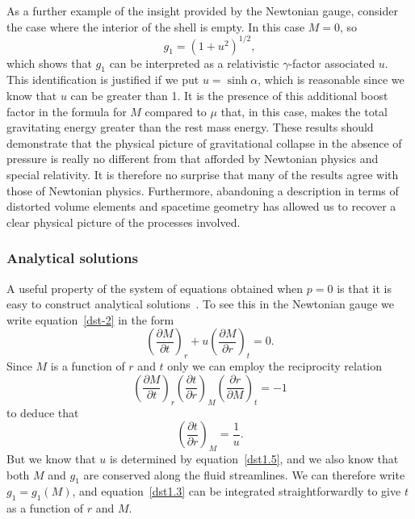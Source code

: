 \documentclass[a4paper]{article}
\numberwithin{equation}{section}
\newcommand{\alp}{\alpha}
\newcommand{\deriv}[2]{\frac{\partial #1}{\partial #2}}
\begin{document}
As a further example of the insight provided by the Newtonian gauge,
consider the case where the interior of the shell is empty.  In this
case $M=0$, so
%
\begin{equation}
g_1 = (1+u^2)^{1/2},
\end{equation}
%
which shows that $g_1$ can be interpreted as a relativistic
$\gamma$-factor associated $u$.  This identification is justified if
we put $u=\sinh\alp$, which is reasonable since we know that $u$ can
be greater than 1.  It is the presence of this additional boost factor
in the formula for $M$ compared to $\mu$ that, in this case, makes
the total gravitating energy greater than the rest mass energy.  These
results should demonstrate that the physical picture of gravitational
collapse in the absence of pressure is really no different from that
afforded by Newtonian physics and special relativity.  It is therefore
no surprise that many of the results agree with those of Newtonian
physics.  Furthermore, abandoning a description in terms of
distorted volume elements and spacetime geometry has allowed us to
recover a clear physical picture of the processes involved.


\subsubsection*{Analytical solutions}

A useful property of the system of equations obtained when $p=0$ is
that it is easy to construct analytical solutions~\cite{tol34,bon47}.
To see this in the Newtonian gauge we write equation~\eqref{dst-2} in the
form
%
\begin{equation}
\left( \deriv{M}{t} \right)_{\!r} + u \left( \deriv{M}{r}
\right)_{\!t} = 0.
\end{equation} 
%
Since $M$ is a function of $r$ and $t$ only we can employ the
reciprocity relation
%
\begin{equation}
\left( \deriv{M}{t} \right)_{\!r}
\left( \deriv{t}{r} \right)_{\!M}
\left( \deriv{r}{M} \right)_{\!t} = -1
\end{equation}
%
to deduce that
%
\begin{equation}
\left( \deriv{t}{r} \right)_{\!M} = \frac{1}{u}.
\label{dst1.3}
\end{equation}
%
But we know that $u$ is determined by equation~\eqref{dst1.5}, and we also
know that both $M$ and $g_1$ are conserved along the fluid
streamlines.  We can therefore write $g_1=g_1(M)$, and
equation~\eqref{dst1.3} can be integrated straightforwardly to give $t$ as
a function of $r$ and $M$.
\end{document}

